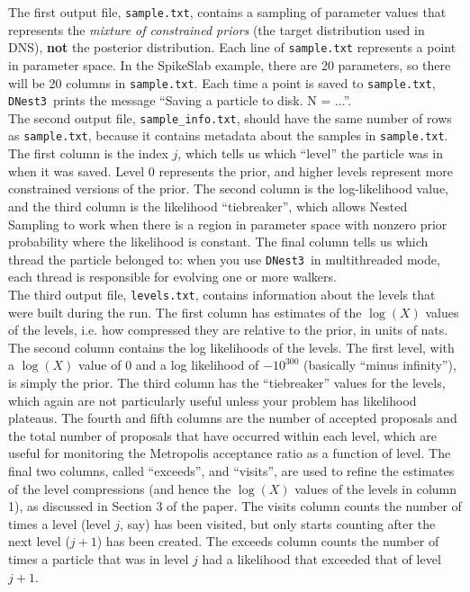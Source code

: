 \documentclass[a4paper, 11pt]{article}
\newcommand{\dnest}{{\tt DNest3}}
\begin{document}
The first output
file, {\tt sample.txt}, contains a sampling of parameter values that
represents the {\it mixture of constrained priors} (the target distribution
used in DNS), {\bf not} the
posterior distribution. Each line of {\tt sample.txt} represents a point in
parameter space. In the SpikeSlab example, there are 20 parameters, so there
will be 20 columns in {\tt sample.txt}.
Each time a point is saved to {\tt sample.txt}, \dnest~prints
the message ``Saving a particle to disk. N = ...''.\\

The second output file, {\tt sample\_info.txt}, should have the same number of
rows as {\tt sample.txt}, because it contains metadata about the samples in
{\tt sample.txt}. The first
column is the index $j$, which tells us which ``level'' the particle was in
when it was saved. Level 0 represents the prior, and higher levels represent
more constrained versions of the prior.
The second column is the log-likelihood value, and the third column is
the likelihood ``tiebreaker'', which allows Nested Sampling to work when
there is a region in parameter space with nonzero prior probability where the
likelihood is constant. The final column tells us which thread the particle
belonged to: when you use \dnest~in multithreaded mode, each thread
is responsible for evolving one or more walkers.\\

The third output file, {\tt levels.txt}, contains information about the levels
that were built during the run. The first column has estimates of the $\log(X)$
values of the levels, i.e. how compressed they are relative to the prior, in
units of nats. The second column contains the log likelihoods of the levels.
The first level, with a $\log(X)$ value of 0 and a log likelihood of
$-10^{300}$ (basically ``minus infinity''), is simply the prior. The third
column has the ``tiebreaker'' values for the levels, which again are not
particularly useful unless your problem has likelihood plateaus. The fourth
and fifth columns are the number of accepted proposals and the total number
of proposals that have occurred within each level, which are useful for
monitoring the Metropolis acceptance ratio as a function of level.
The final two columns, called ``exceeds'', and ``visits'', are used to refine
the estimates of the level compressions (and hence the $\log(X)$ values of
the levels in column 1), as discussed in Section 3 of the
paper. The visits column counts the number of times a level (level $j$, say)
has been visited, but only starts counting after the next level ($j+1$) has been created. The exceeds column counts the number of times a particle that was
in level $j$ had a likelihood that exceeded that of level $j+1$.
\\
\end{document}

